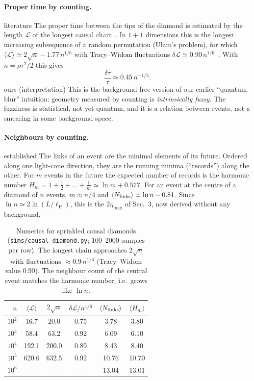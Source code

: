 \documentclass[11pt,a4paper]{article}
\newcommand{\tagbox}[2]{\textsf{\scriptsize\colorbox{#1!12}{\textcolor{#1!70!black}{#2}}}}
\newcommand{\est}{\tagbox{gray}{established}}
\newcommand{\lit}{\tagbox{blue}{literature}}
\newcommand{\ours}{\tagbox{orange}{ours}}
\newcommand{\lP}{\ell_{\mathrm P}}
\begin{document}
\paragraph{Proper time by counting.} \lit{} The proper time between the tips of the diamond is estimated by the length $\mathcal L$ of the longest causal chain~\cite{BrightwellGregory91}. In $1+1$ dimensions this is the longest increasing subsequence of a random permutation (Ulam's problem), for which $\langle\mathcal L\rangle\simeq2\sqrt n-1.77\,n^{1/6}$ with Tracy--Widom fluctuations $\delta\mathcal L\simeq0.90\,n^{1/6}$~\cite{BDJ99}. With $n=\rho\tau^2/2$ this gives
\begin{equation}
\frac{\delta\tau}{\tau}\simeq0.45\,n^{-1/3}.
\end{equation}
\ours{} (interpretation) This is the background-free version of our earlier ``quantum blur'' intuition: geometry measured by counting is \emph{intrinsically fuzzy}. The fuzziness is statistical, not yet quantum, and it is a relation between events, not a smearing in some background space.

\paragraph{Neighbours by counting.} \est{} The links of an event are the minimal elements of its future. Ordered along one light-cone direction, they are the running minima (``records'') along the other. For $m$ events in the future the expected number of records is the harmonic number $H_m=1+\tfrac12+\dots+\tfrac1m\simeq\ln m+0.577$. For an event at the centre of a diamond of $n$ events, $m\approx n/4$ and $\langle N_{\rm links}\rangle\simeq\ln n-0.81$. Since $\ln n\simeq2\ln(L/\lP)$, this is the $2\eta_{\max}$ of Sec.~3, now derived without any background.

\begin{table}[t]
\centering\small
\begin{tabular}{@{}rccccc@{}}
\toprule
$n$ & $\langle\mathcal L\rangle$ & $2\sqrt n$ & $\delta\mathcal L/n^{1/6}$ & $\langle N_{\rm links}\rangle$ & $\langle H_m\rangle$\\
\midrule
$10^2$ & 16.7 & 20.0 & 0.75 & 3.78 & 3.80\\
$10^3$ & 58.4 & 63.2 & 0.92 & 6.09 & 6.10\\
$10^4$ & 192.1 & 200.0 & 0.89 & 8.43 & 8.40\\
$10^5$ & 620.6 & 632.5 & 0.92 & 10.76 & 10.70\\
$10^6$ & --- & --- & --- & 13.04 & 13.01\\
\bottomrule
\end{tabular}
\caption{Numerics for sprinkled causal diamonds (\texttt{sims/causal\_diamond.py}; 100--2000 samples per row). The longest chain approaches $2\sqrt n$ with fluctuations $\approx0.9\,n^{1/6}$ (Tracy--Widom value $0.90$). The neighbour count of the central event matches the harmonic number, i.e.\ grows like $\ln n$.}
\label{tab:diamond}
\end{table}
\end{document}
